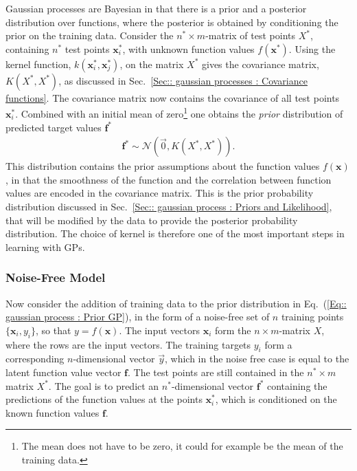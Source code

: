 \documentclass[twoside,english]{uiofysmaster}
\begin{document}
{{Gaussian processes are Bayesian in that there is a prior and a posterior distribution over functions, where the posterior is obtained by conditioning the prior on the training data. Consider the $n^* \times m$-matrix of test points $X^*$, containing $n^*$ test points $\textbf{x}_i^*$, with unknown function values $f(\textbf{x}^*)$. Using the kernel function, $k(\textbf{x}_i^*, \textbf{x}_j^*)$, on the matrix $X^*$ gives the covariance matrix, $K(X^*, X^*)$, as discussed in Sec.~\ref{Sec:: gaussian processes : Covariance functions}. The covariance matrix  now contains the covariance of all test points $\textbf{x}^*_i$. Combined with an initial mean of zero\footnote{The mean does not have to be zero, it could for example be the mean of the training data.} one obtains the \textit{prior} distribution of predicted target values $\textbf{f}^*$
\begin{align}
\textbf{f}^* \sim \mathcal{N} (\vec{0}, K(X^*, X^*)).\label{Eq:: gaussian process : Prior GP}
\end{align} 
This distribution contains the prior assumptions about the function values $f(\textbf{x})$, in that the smoothness of the function and the correlation between function values are encoded in the covariance matrix. This is the prior probability distribution discussed in Sec.~\ref{Sec:: gaussian process : Priors and Likelihood}, that will be modified by the data to provide the posterior probability distribution. The choice of kernel is therefore one of the most important steps in learning with GPs. 

\subsubsection{Noise-Free Model}

Now consider the addition of training data to the prior distribution in Eq.~(\ref{Eq:: gaussian process : Prior GP}), in the form of a noise-free set of $n$ training points $\{\textbf{x}_i, y_i\}$, so that $y = f(\textbf{x})$. The input vectors $\textbf{x}_i$ form the $n \times m$-matrix $X$, where the rows are the input vectors. The training targets $y_i$ form a corresponding $n$-dimensional vector $\vec{y}$, which in the noise free case is equal to the latent function value vector $\textbf{f}$. The test points are still contained in the $n^* \times m$ matrix $X^*$. The goal is to predict an $n^*$-dimensional vector $\textbf{f}^*$ containing the predictions of the function values at the points $\textbf{x}^*_i$, which is conditioned on the known function values $\textbf{f}$. 

}}
\end{document}
